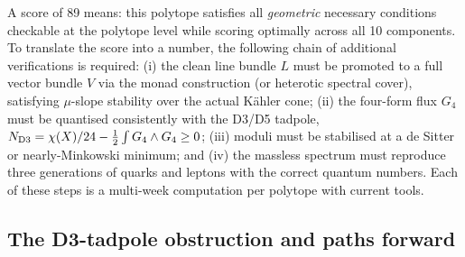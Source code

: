 \documentclass[11pt,a4paper]{article}
\begin{document}
A score of 89 means: this polytope satisfies all
\emph{geometric} necessary conditions checkable at the polytope
level while scoring optimally across all 10 components.
To translate the score into a number, the following chain of
additional verifications is required:
(i) the clean line bundle $L$ must be promoted to a full vector
bundle $V$ via the monad construction (or heterotic spectral cover),
satisfying $\mu$-slope stability over the actual K\"ahler cone;
(ii) the four-form flux $G_4$ must be quantised consistently with
the D3/D5 tadpole, $N_{\rm D3} = \chi(X)/24 - \tfrac{1}{2}\int G_4\wedge G_4 \geq 0$;
(iii) moduli must be stabilised at a de Sitter or nearly-Minkowski
minimum; and (iv) the massless spectrum must reproduce three
generations of quarks and leptons with the correct quantum numbers.
Each of these steps is a multi-week computation per polytope
with current tools.

\subsection{The D3-tadpole obstruction and paths forward}
\end{document}
